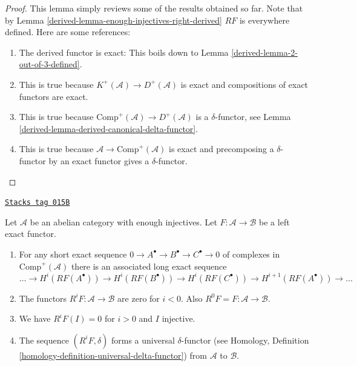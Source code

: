 \begin{proof}

This lemma simply reviews some of the results obtained so far.
Note that by
Lemma \ref{derived-lemma-enough-injectives-right-derived}
$RF$ is everywhere defined. Here are some references:
\begin{enumerate}
\item The derived functor is exact: This boils down to
Lemma \ref{derived-lemma-2-out-of-3-defined}.
\item This is true because $K^{+}(\mathcal{A}) \to D^{+}(\mathcal{A})$
is exact and compositions of exact functors are exact.
\item This is true because
$\text{Comp}^{+}(\mathcal{A}) \to D^{+}(\mathcal{A})$ is
a $\delta$-functor, see
Lemma \ref{derived-lemma-derived-canonical-delta-functor}.
\item This is true because $\mathcal{A} \to \text{Comp}^{+}(\mathcal{A})$
is exact and precomposing a $\delta$-functor by an exact functor gives
a $\delta$-functor.
\end{enumerate}
\end{proof}

\begin{lemma}
\label{derived-lemma-higher-derived-functors}
\href{https://stacks.math.columbia.edu/tag/015B}{\texttt{Stacks tag 015B}}

Let $\mathcal{A}$ be an abelian category with enough injectives.
Let $F : \mathcal{A} \to \mathcal{B}$ be a left exact functor.
\begin{enumerate}
\item For any short exact sequence
$0 \to A^\bullet \to B^\bullet \to C^\bullet \to 0$
of complexes in $\text{Comp}^{+}(\mathcal{A})$ there
is an associated long exact sequence
$$
\ldots \to
H^i(RF(A^\bullet)) \to
H^i(RF(B^\bullet)) \to
H^i(RF(C^\bullet)) \to
H^{i + 1}(RF(A^\bullet)) \to \ldots
$$
\item The functors $R^iF : \mathcal{A} \to \mathcal{B}$
are zero for $i < 0$. Also $R^0F = F : \mathcal{A} \to \mathcal{B}$.
\item We have $R^iF(I) = 0$ for $i > 0$ and $I$ injective.
\item The sequence $(R^iF, \delta)$ forms a universal $\delta$-functor (see
Homology, Definition \ref{homology-definition-universal-delta-functor})
from $\mathcal{A}$ to $\mathcal{B}$.
\end{enumerate}
\end{lemma}

